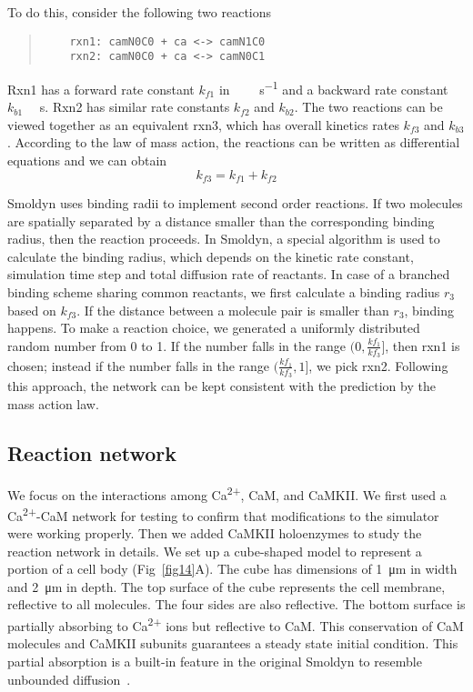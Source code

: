 \documentclass[10pt,letterpaper]{article}
\begin{document}
To do this, consider the following two reactions
\begin{quote}
\begin{verbatim}
	rxn1: camN0C0 + ca <-> camN1C0
	rxn2: camN0C0 + ca <-> camN0C1
\end{verbatim}
\end{quote}

Rxn1 has a forward rate constant $k_{f1}$ in \SI{}{\per\micro\Molar\per\s} and a backward rate constant $k_{b1}$ \SI{}{\per\s}. Rxn2 has similar rate constants $k_{f2}$ and $k_{b2}$. The two reactions can be viewed together as an equivalent rxn3, which has overall kinetics rates $k_{f3}$ and $k_{b3}$. According to the law of mass action, the reactions can be written as differential equations and we can obtain
\begin{equation}
	k_{f3}=k_{f1}+k_{f2}
\end{equation}

Smoldyn uses binding radii to implement second order reactions. If two molecules are spatially separated by a distance smaller than the corresponding binding radius, then the reaction proceeds. In Smoldyn, a special algorithm is used to calculate the binding radius, which depends on the kinetic rate constant, simulation time step and total diffusion rate of reactants. In case of a branched binding scheme sharing common reactants, we first calculate a binding radius $r_3$ based on $k_{f3}$. If the distance between a molecule pair is smaller than $r_3$, binding happens. To make a reaction choice, we generated a uniformly distributed random number from 0 to 1. If the number falls in the range $(0,\frac{kf_1}{kf_3}]$, then rxn1 is chosen; instead if the number falls in the range $(\frac{kf_1}{kf_3}, 1]$, we pick rxn2. Following this approach, the network can be kept consistent with the prediction by the mass action law. 

\subsection*{Reaction network}
We focus on the interactions among Ca\textsuperscript{2+}, CaM, and CaMKII. We first used a Ca\textsuperscript{2+}-CaM network for testing to confirm that modifications to the simulator were working properly. Then we added CaMKII holoenzymes to study the reaction network in details. We set up a cube-shaped model to represent a portion of a cell body (Fig~\ref{fig14}A). The cube has dimensions of \SI{1}{\um} in width and \SI{2}{\um} in depth. The top surface of the cube represents the cell membrane, reflective to all molecules. The four sides are also reflective. The bottom surface is partially absorbing to Ca\textsuperscript{2+} ions but reflective to CaM. This conservation of CaM molecules and CaMKII subunits guarantees a steady state initial condition. This partial absorption is a built-in feature in the original Smoldyn to resemble unbounded diffusion~\cite{Andrews:2009dr}.
\end{document}
